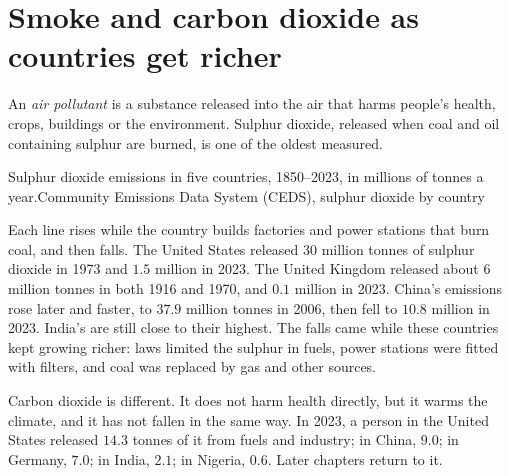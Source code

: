 \section{Smoke and carbon dioxide as countries get richer}

\begin{definition}\label{def:g6:food-and-energy:air-pollutant}
An \emph{air pollutant} is a substance released into the
air that harms people's health, crops, buildings or the environment. Sulphur
dioxide, released when coal and oil containing sulphur are burned, is one of
the oldest measured.
\end{definition}

\begin{omchart}{Sulphur dioxide emissions in five countries, 1850--2023, in
millions of tonnes a year.}{Community Emissions Data System (CEDS), sulphur
dioxide by country}
\end{omchart}

Each line rises while the country builds factories and power stations that burn
coal, and then falls. The United States released 30 million tonnes of sulphur
dioxide in 1973 and $1.5$ million in 2023. The United Kingdom released about 6
million tonnes in both 1916 and 1970, and $0.1$ million in 2023. China's emissions
rose later and faster, to $37.9$ million tonnes in 2006, then fell to $10.8$
million in 2023. India's are still close to their highest. The falls came while
these countries kept growing richer: laws limited the sulphur in fuels, power
stations were fitted with filters, and coal was replaced by gas and other
sources.

Carbon dioxide is different. It does not harm health directly, but it warms the
climate, and it has not fallen in the same way. In 2023, a person in the United
States released $14.3$ tonnes of it from fuels and industry; in China, $9.0$; in
Germany, $7.0$; in India, $2.1$; in Nigeria, $0.6$. Later chapters return to it.

